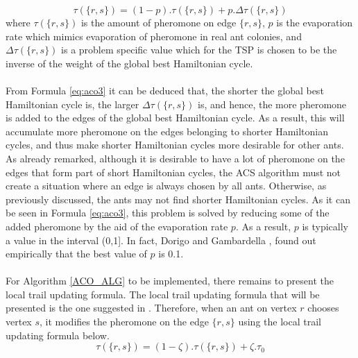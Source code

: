 \documentclass[12pt]{article}
\numberwithin{equation}{subsection}
\numberwithin{table}{subsection}
\numberwithin{algorithm}{subsection}
\numberwithin{figure}{subsection}
\begin{document}
\begin{equation}
  \label{eq:aco3}
  \tau(\{r,s\})=(1-p).\tau(\{r,s\})+ p.\Delta\tau(\{r,s\})
\end{equation}
where $\tau(\{r,s\})$ is the amount of pheromone on edge $\{r,s\}$, $p$ is the evaporation rate which mimics evaporation of pheromone in real ant colonies, and $\Delta\tau(\{r,s\})$ is a problem specific value which for the TSP is chosen to be the inverse of the weight of the global best Hamiltonian cycle.\\\\
From Formula \ref{eq:aco3} it can be deduced that, the shorter the global best Hamiltonian cycle is, the larger $\Delta\tau(\{r,s\})$ is, and hence, the more pheromone is added to the edges of the global best Hamiltonian cycle. As a result, this will accumulate more pheromone on the edges belonging to shorter Hamiltonian cycles, and thus make shorter Hamiltonian cycles more desirable for other ants. As already remarked, although it is desirable to have a lot of pheromone on the edges that form part of short Hamiltonian cycles, the ACS algorithm must not create a situation where an edge is always chosen by all ants. Otherwise, as previously discussed, the ants may not find shorter Hamiltonian cycles. As it can be seen in Formula \ref{eq:aco3}, this problem is solved by reducing some of the added pheromone by the aid of the evaporation rate $p$. As a result, $p$ is typically a value in the interval (0,1]. In fact, Dorigo and Gambardella \cite{dorigo_gambardella_1997}, found out empirically that the best value of $p$ is 0.1. \cite{dorigo_gambardella_1997}\\\\
For Algorithm \ref{ACO_ALG} to be implemented, there remains to present the local trail updating formula. The local trail updating formula that will be presented is the one suggested in \cite{dorigo_stutzle_thomas_2004}. Therefore, when an ant on vertex $r$ chooses vertex $s$, it modifies the pheromone on the edge $\{r,s\}$ using the local trail updating formula below.
\begin{equation}
  \label{eq:aco4}
  \tau(\{r,s\})=(1-\zeta).\tau(\{r,s\})+\zeta.\tau_0
\end{equation}
\end{document}
